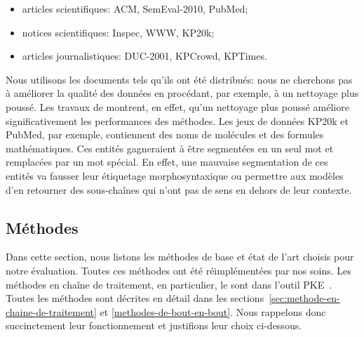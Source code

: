 \begin{itemize}
    
    \item articles scientifiques: ACM, SemEval-2010, PubMed;
    \item notices scientifiques: Inspec, WWW, KP20k;
    \item articles journalistiques: DUC-2001, KPCrowd, KPTimes.
\end{itemize}

Nous utilisons les documents tels qu'ils ont été distribués: nous ne cherchons pas à améliorer la qualité des données en procédant, par exemple, à un nettoyage plus poussé.
Les travaux de \citet{boudin_how_2016} montrent, en effet, qu'un nettoyage plus poussé améliore significativement les performances des méthodes.
Les jeux de données KP20k et PubMed, par exemple, contiennent des noms de molécules et des formules mathématiques.
Ces entités gagneraient à être segmentées en un seul mot et remplacées par un mot spécial.
En effet, une mauvaise segmentation de ces entités va fausser leur étiquetage morphosyntaxique ou permettre aux modèles d'en retourner des sous-chaînes qui n'ont pas de sens en dehors de leur contexte.



\subsection{Méthodes}

Dans cette section, nous listons les méthodes de base et état de l'art choisis pour notre évaluation.
Toutes ces méthodes ont été réimplémentées par nos soins. Les méthodes en chaîne de traitement, en particulier, le sont dans l'outil PKE~\cite{boudin_pke_2016}.
Toutes les méthodes sont décrites en détail dans les sections~\ref{sec:methode-en-chaine-de-traitement} et \ref{methodes-de-bout-en-bout}.
Nous rappelons donc succinctement leur fonctionnement et justifions leur choix ci-dessous.

